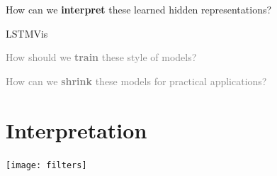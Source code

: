 \documentclass{beamer}
\let\tempone\itemize
\let\temptwo\enditemize
\renewenvironment{itemize}{\tempone\addtolength{\itemsep}{0.5\baselineskip}}{\temptwo}
\newcommand{\air}{\vspace{0.25cm}}
\newcommand{\Cite}[1]{{\footnotesize \citep{#1}}}
\begin{document}
\begin{frame}
  \centerline{}
  \air 
  \air

  \begin{itemize}
  \item How can we \textbf{interpret} these learned hidden representations? 

    \begin{center}
      \alert{LSTMVis} 

      \Cite{Strobelt2016}
    \end{center}


    \air 

    

  \item  \textcolor{gray}{How should we \textbf{train} these style of models? \Cite{Wiseman2016a}}
    \air 
  \item  \textcolor{gray}{How can we \textbf{shrink} these models for practical applications? \Cite{Kim2016a}}
  \end{itemize}
\end{frame}


\section{Interpretation}

\begin{frame}
  \air 
  \texttt{[image: filters]}
  \begin{center}
     \Cite{DBLP:conf/eccv/ZeilerF14}
  \end{center}
\end{frame}



\end{document}
